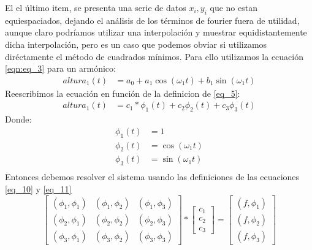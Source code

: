 \documentclass[10pt,a4paper]{article}
\numberwithin{equation}{section}
\numberwithin{figure}{section}
\numberwithin{table}{section}
\begin{document}
El el último item, se presenta una serie de datos ${x_i,y_i}$ que no estan equiespaciados, dejando el análisis de los términos de fourier fuera de utilidad, aunque claro podríamos 
utilizar una interpolación y muestrar equidistantemente dicha interpolación, pero es un caso que podemos obviar si utilizamos diréctamente el método de cuadrados mínimos.
Para ello utilizamos la ecuación \ref*{eqn:eq_3} para un armónico:
\begin{equation}\label{eq_12}
    \begin{split}
        altura_1(t) &= a_0 + a_1 \cos(\omega_1 t) + b_1 \sin(\omega_1 t)
    \end{split}
\end{equation}
Reescribimos la ecuación en función de la definicion de \ref*{eq_5}:
\begin{equation}\label{eq_13}
    \begin{split}
        altura_1(t) &= c_1 * \phi_1(t) + c_2 \phi_2(t) + c_3 \phi_3(t)
    \end{split}
\end{equation}
Donde:
\begin{equation}\label{eq_14}
    \begin{split}
        \phi_1(t) &= 1 \\
        \phi_2(t) &= \cos(\omega_1 t)\\
        \phi_3(t) &= \sin(\omega_1 t)\\
    \end{split}
\end{equation}
Entonces debemos resolver el sistema usando las definiciones de las ecuaciones \ref*{eq_10} y \ref*{eq_11}
\begin{equation}\label{eq_15}
    \begin{bmatrix}
        (\phi_1,\phi_1) & (\phi_1,\phi_2) & (\phi_1,\phi_3)\\
        (\phi_2,\phi_1) & (\phi_2,\phi_2) & (\phi_2,\phi_3)\\
        (\phi_3,\phi_1) & (\phi_3,\phi_2) & (\phi_3,\phi_3)
    \end{bmatrix} * 
    \begin{bmatrix}
        c_1\\
        c_2\\
        c_3
    \end{bmatrix} =
    \begin{bmatrix}
        (f,\phi_1)\\
        (f,\phi_2)\\
        (f,\phi_3)
    \end{bmatrix}
\end{equation}
\end{document}
